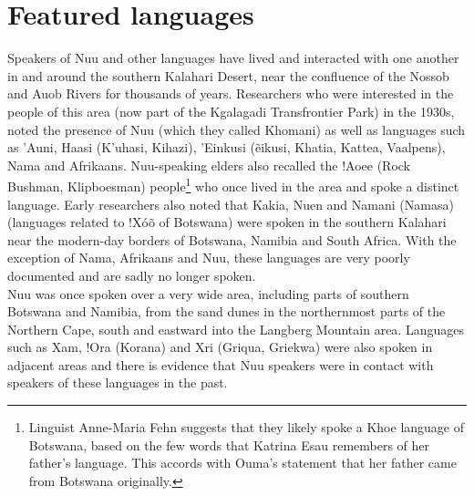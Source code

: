 \newpage


\markboth{}{}
\addtocounter{section}{-1}
\tocless\section{Featured languages}
{}
\markboth{}{}

Speakers of N\textipa{\textvertline}uu and other languages have lived
and interacted with one another in and around the southern Kalahari
Desert, near the confluence of the Nossob and Auob Rivers for
thousands of years. Researchers who were interested in the people of
this area (now part of the Kgalagadi Transfrontier Park) in the 1930s,
noted the presence of N\textipa{\textvertline}uu (which they called
\textipa{\textdoublebarpipe}Khomani) as well as languages such as
\textipa{\textvertline}'Auni, \textipa{\textvertline}Haasi
(K'u\textipa{\textvertline}ha\textipa{:}si,
Ki\textipa{\textvertline}hazi), \textipa{\textdoublebarpipe}'Einkusi
(\textipa{\textdoublebarpipe}\~{e}ikusi, Khatia, Kattea, Vaalpens),
Nama and Afrikaans. N\textipa{\textvertline}uu-speaking elders also
recalled the !Ao\textipa{\textdoublebarpipe}ee (Rock Bushman,
Klipboesman) people\footnote{Linguist Anne-Maria Fehn suggests that
they likely spoke a Khoe language of Botswana, based on the few words
that Katrina Esau remembers of her father's language. This accords
with Ouma's statement that her father came from Botswana originally.}
who once lived in the area and spoke a distinct language. Early
researchers also noted that Kakia,
N\textipa{\textvertline}u\textipa{\textdoublevertline}en and
N\textipa{\textvertline}amani (N\textipa{\textvertline}amasa)
(languages related to !X\'{o}\~{o} of Botswana) were spoken in the
southern Kalahari near the modern-day borders of Botswana, Namibia and
South Africa. With the exception of Nama, Afrikaans and
N\textipa{\textvertline}uu, these languages are very poorly documented
and are sadly no longer spoken.\\

N\textipa{\textvertline}uu was once spoken over a very wide area,
including parts of southern Botswana and Namibia, from the sand dunes
in the northernmost parts of the Northern Cape, south and eastward
into the Langberg Mountain area. Languages such as
\textipa{\textvertline}Xam, !Ora (Korana) and Xri (Griqua, Griekwa)
were also spoken in adjacent areas and there is evidence that
N\textipa{\textvertline}uu speakers were in contact with speakers of
these languages in the past.\\

